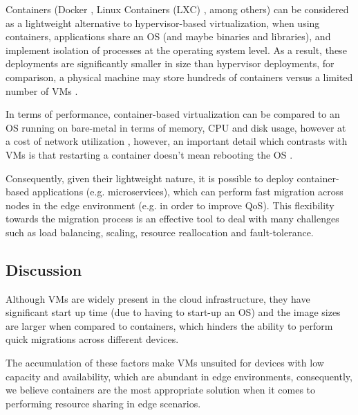 Containers (Docker \cite{docker}, Linux Containers (LXC) \cite{lxc}, among others) can be considered as a lightweight alternative to hypervisor-based virtualization, when using containers, applications share an OS (and maybe binaries and libraries), and implement isolation of processes at the operating system level. As a result, these deployments are significantly smaller in size than hypervisor deployments, for comparison, a physical machine may store hundreds of containers versus a limited number of VMs \cite{7036275}.  

In terms of performance, container-based virtualization can be compared to an OS running on bare-metal in terms of memory, CPU and disk usage, however at a cost of network utilization \cite{preeth2015evaluation}, however, an important detail which contrasts with VMs is that restarting a container doesn't mean rebooting the OS \cite{7036275}.

Consequently, given their lightweight nature, it is possible to deploy container-based applications (e.g. microservices), which can perform fast migration across nodes in the edge environment (e.g. in order to improve QoS). This flexibility towards the migration process is an effective tool to deal with many challenges such as load balancing, scaling, resource reallocation and fault-tolerance. 

\subsection{Discussion}

Although VMs are widely present in the cloud infrastructure, they have significant start up time (due to having to start-up an OS) and the image sizes are larger when compared to containers, which hinders the ability to perform quick migrations across different devices. 

The accumulation of these factors make VMs unsuited for devices with low capacity and availability, which are abundant in edge environments, consequently, we believe containers are the most appropriate solution when it comes to performing resource sharing in edge scenarios. 